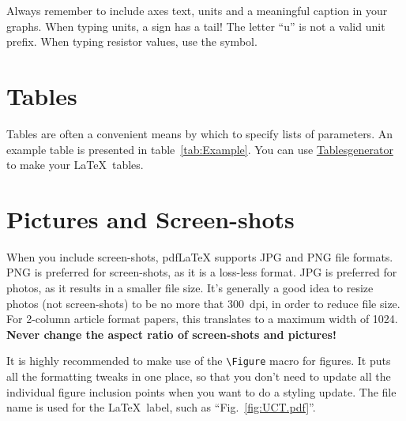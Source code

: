 
Always remember to include axes text, units and a meaningful caption in your graphs.  When typing units, a \micro{} sign has a tail!  The letter ``u'' is not a valid unit prefix.  When typing resistor values, use the \ohm{} symbol.

\section{Tables}

Tables are often a convenient means by which to specify lists of parameters.  An example table is presented in table~\ref{tab:Example}. You can use \href{https://www.tablesgenerator.com/}{Tablesgenerator} to make your \LaTeX\ tables.


\section{Pictures and Screen-shots}

When you include screen-shots, pdf\LaTeX{} supports JPG and PNG file formats.  PNG is preferred for screen-shots, as it is a loss-less format.  JPG is preferred for photos, as it results in a smaller file size.  It's generally a good idea to resize photos (not screen-shots) to be no more that 300~dpi, in order to reduce file size.  For 2-column article format papers, this translates to a maximum width of 1024.  \textbf{Never change the aspect ratio of screen-shots and pictures!}

It is highly recommended to make use of the \verb|\Figure| macro for figures.  It puts all the formatting tweaks in one place, so that you don't need to update all the individual figure inclusion points when you want to do a styling update.  The file name is used for the \LaTeX\ label, such as ``Fig.~\ref{fig:UCT.pdf}''.

